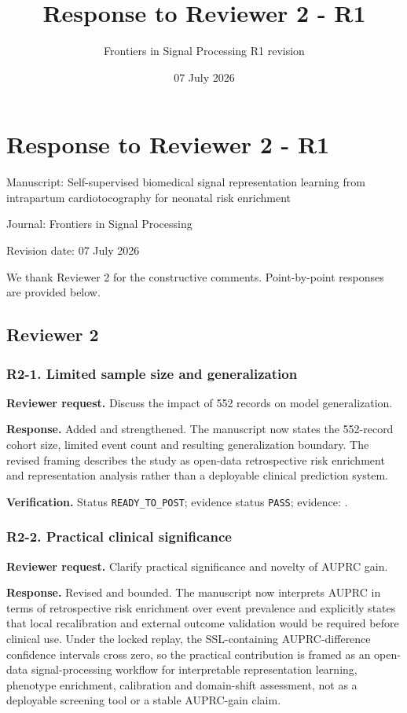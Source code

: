 \documentclass[11pt]{article}
\title{Response to Reviewer 2 - R1}
\author{Frontiers in Signal Processing R1 revision}
\date{07 July 2026}
\begin{document}
\maketitle

\section*{Response to Reviewer 2 - R1}

Manuscript: Self-supervised biomedical signal representation learning from intrapartum cardiotocography for neonatal risk enrichment


Journal: Frontiers in Signal Processing


Revision date: 07 July 2026


We thank Reviewer 2 for the constructive comments. Point-by-point responses are provided below.


\subsection*{Reviewer 2}

\subsubsection*{R2-1. Limited sample size and generalization}

\textbf{Reviewer request.} Discuss the impact of 552 records on model generalization.


\textbf{Response.} Added and strengthened. The manuscript now states the 552-record cohort size, limited event count and resulting generalization boundary. The revised framing describes the study as open-data retrospective risk enrichment and representation analysis rather than a deployable clinical prediction system.


\textbf{Verification.} Status \texttt{READY\_TO\_POST}; evidence status \texttt{PASS}; evidence: .


\subsubsection*{R2-2. Practical clinical significance}

\textbf{Reviewer request.} Clarify practical significance and novelty of AUPRC gain.


\textbf{Response.} Revised and bounded. The manuscript now interprets AUPRC in terms of retrospective risk enrichment over event prevalence and explicitly states that local recalibration and external outcome validation would be required before clinical use. Under the locked replay, the SSL-containing AUPRC-difference confidence intervals cross zero, so the practical contribution is framed as an open-data signal-processing workflow for interpretable representation learning, phenotype enrichment, calibration and domain-shift assessment, not as a deployable screening tool or a stable AUPRC-gain claim.
\end{document}
